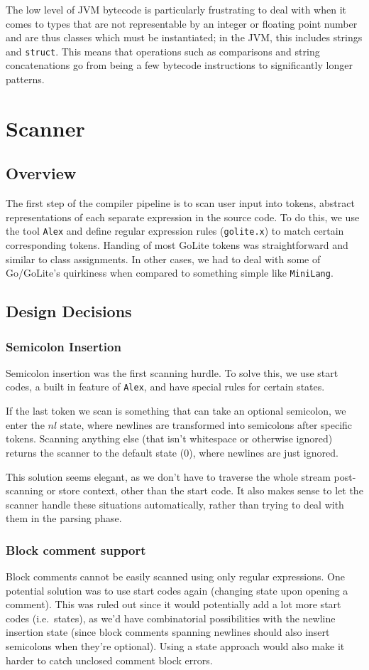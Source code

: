 \documentclass[11pt]{article}
\begin{document}
The low level of JVM bytecode is particularly frustrating to deal with
when it comes to types that are not representable by an integer or
floating point number and are thus classes which must be instantiated;
in the JVM, this includes strings and \texttt{struct}. This means that operations
such as comparisons and string concatenations go from being a few
bytecode instructions to significantly longer patterns.
\section{Scanner}
\subsection{Overview}
The first step of the compiler pipeline is to scan user input into
tokens, abstract representations of each separate expression in the
source code. To do this, we use the tool
\texttt{Alex}\cite{github:alex} and define regular expression rules (\texttt{golite.x}) to
match certain corresponding tokens. Handing of most GoLite tokens was straightforward and similar
to class assignments. In other cases, we had to deal with some of
Go/GoLite's quirkiness when compared to something simple like
\texttt{MiniLang}.

\subsection{Design Decisions}
\subsubsection{Semicolon Insertion}
Semicolon insertion was the first scanning hurdle. To solve this, we
use start codes, a built in feature of \texttt{Alex}, and have special
rules for certain states.

If the last token we scan is something that can take an optional
semicolon, we enter the \(nl\) state, where newlines are transformed
into semicolons after specific tokens. Scanning anything else (that
isn't whitespace or otherwise ignored) returns the scanner to the
default state (\(0\)), where newlines are just ignored.

This solution seems elegant, as we don't have to traverse the whole
stream post-scanning or store context, other than the start code. It
also makes sense to let the scanner handle these situations
automatically, rather than trying to deal with them in the parsing
phase.
\subsubsection{Block comment support}
Block comments cannot be easily scanned using only regular
expressions. One potential solution was to use start codes again
(changing state upon opening a comment). This was ruled out since it
would potentially add a lot more start codes (i.e.\ states), as we'd
have combinatorial possibilities with the newline insertion state
(since block comments spanning newlines should also insert semicolons
when they're optional). Using a state approach would also make it
harder to catch unclosed comment block errors.
\end{document}
